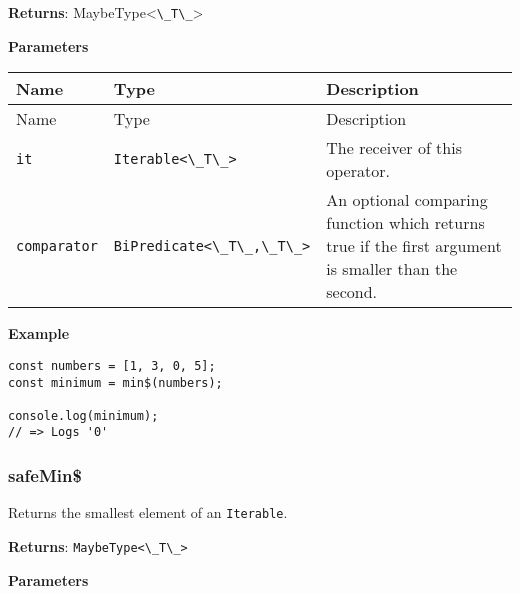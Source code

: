 \textbf{Returns}:
MaybeType\textless{}\passthrough{\lstinline!\_T\_!}\textgreater{}

\textbf{Parameters}

\begin{longtable}[]{
  >{\raggedright\arraybackslash}p{}
  >{\raggedright\arraybackslash}p{}
  >{\raggedright\arraybackslash}p{}@{}}

\toprule\noalign{}
Name & Type & Description \\
\midrule\noalign{}
\endfirsthead
\toprule\noalign{}
Name & Type & Description \\
\midrule\noalign{}
\endhead
\bottomrule\noalign{}
\endlastfoot
\passthrough{\lstinline!it!} & \passthrough{\lstinline!Iterable<\_T\_>!}
& The receiver of this operator. \\
\passthrough{\lstinline!comparator!} &
\passthrough{\lstinline!BiPredicate<\_T\_,\_T\_>!} & An optional
comparing function which returns true if the first argument is smaller
than the second. \\
\end{longtable}

\textbf{Example}

\begin{lstlisting}[label=572f6b0e-eb5f-40d5-b97e-e94634aa3d6b]
const numbers = [1, 3, 0, 5];
const minimum = min$(numbers);
                              
console.log(minimum);
// => Logs '0'
\end{lstlisting}

\hypertarget{22fcb726-cee7-4692-9189-a7f90875accc}{%
\subsubsection{safeMin\$}\label{22fcb726-cee7-4692-9189-a7f90875accc}}

Returns the smallest element of an \passthrough{\lstinline!Iterable!}.

\textbf{Returns}: \passthrough{\lstinline!MaybeType<\_T\_>!}

\textbf{Parameters}

